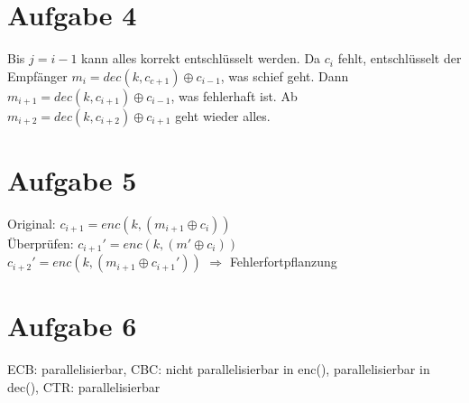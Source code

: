 \documentclass{article}
\begin{document}
	\section*{Aufgabe 4}
	Bis $j = i-1$ kann alles korrekt entschlüsselt werden. Da $c_i$ fehlt, entschlüsselt der Empfänger $m_i = dec(k, c_{c+1}) \oplus c_{i-1}$, was schief geht. Dann $m_{i+1} = dec(k, c_{i+1}) \oplus c_{i-1}$, was fehlerhaft ist. Ab $m_{i+2} = dec(k, c_{i+2}) \oplus c_{i+1}$ geht wieder alles. 
	
	\section*{Aufgabe 5}
	Original: $c_{i+1} = enc(k, (m_{i+1} \oplus c_i))$ \\
	Überprüfen: $c_{i+1}' = enc(k, (m' \oplus c_i))$ \\
	$c_{i+2}' = enc(k, (m_{i+1} \oplus c_{i+1}'))$ $\Rightarrow$ Fehlerfortpflanzung
	
	\section*{Aufgabe 6}
	ECB: parallelisierbar, CBC: nicht parallelisierbar in enc(), parallelisierbar in dec(), CTR: parallelisierbar
\end{document}
